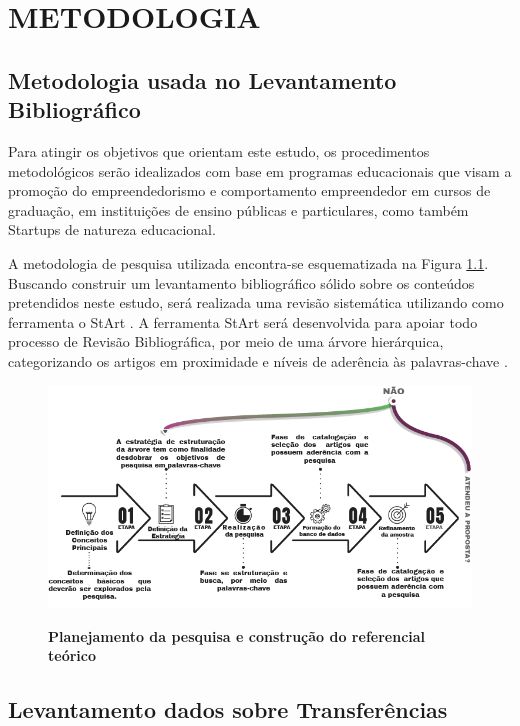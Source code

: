 \chapter{METODOLOGIA}

\section{Metodologia usada no Levantamento Bibliográfico}


Para atingir os objetivos que orientam este estudo, os procedimentos metodológicos serão idealizados com base em programas educacionais que visam a promoção do empreendedorismo e comportamento empreendedor em cursos de graduação, em instituições de ensino públicas e particulares, como também Startups de natureza educacional.


A metodologia de pesquisa utilizada encontra-se esquematizada na Figura \ref{figura_referencial}. Buscando construir um levantamento bibliográfico sólido sobre os conteúdos pretendidos neste estudo, será realizada uma revisão sistemática utilizando como ferramenta o StArt \cite{lapes_start_2016}. A ferramenta StArt será desenvolvida para apoiar todo processo de Revisão Bibliográfica, por meio de uma árvore hierárquica, categorizando os artigos em proximidade e níveis de aderência às palavras-chave \cite{hernandes_avaliacao_2010}.


\begin{figure}[H]
\centering
\caption{\textbf{Planejamento da pesquisa e construção do referencial teórico}}
\includegraphics[scale=0.6]{Imagens/fases_pesquisa_bibliografica.png}
\label{figura_referencial}
\end{figure}

\section{Levantamento dados sobre Transferências}

